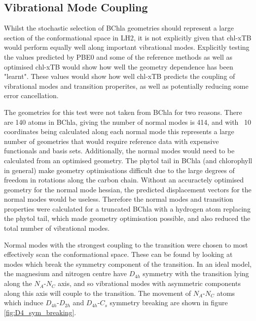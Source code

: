 \subsection{Vibrational Mode Coupling}
\label{subsec:pot_energy_surfaces}

Whilst the stochastic selection of BChla geometries should represent a large section 
of the conformational space in LH2, it is not explicitly given that chl-xTB would
perform equally well along important vibrational modes. Explicitly testing the
values predicted by PBE0 and some of the reference methods as well as optimised
chl-xTB would show how well the geometry dependence has been "learnt". These values
would show how well chl-xTB predicts the coupling of vibrational modes and transition 
properites, as well as potentially reducing some error cancellation.

The geometries for this test were not taken from BChla for two reasons. There are
140 atoms in BChla, giving the number of normal modes is 414, and with ~10 coordinates
being calculated along each normal mode this represents a large number of geometries
that would require reference data with expensive functionals and basis sets. Additionally,
the normal modes would need to be calculated from an optimised geometry. The phytol
tail in BChla (and chlorophyll in general) make geometry optimisations difficult
due to the large degrees of freedom in rotations along the carbon chain. Without
an accuractely optimised geometry for the normal mode hessian, the predicted displacement
vectors for the normal modes would be useless. Therefore the normal modes and transition 
properties were calculated for a truncated BChla with a hydrogen atom replacing 
the phytol tail, which made geometry optimisation possible, and also reduced the
total number of vibrational modes.

Normal modes with the strongest coupling to the \Qy transition were chosen to most
effectively scan the conformational space. These can be found by looking at modes
which break the symmetry component of the \Qy transition. In an ideal model, the 
magnesium and nitrogen centre have $D_{4h}$ symmetry with the \Qy transition lying 
along the $N_A$-$N_C$ axis, and so vibrational modes with asymmetric components 
along this axis will couple to the transition. The movement of $N_A$-$N_C$ atoms 
which induce $D_{4h}$-$D_{2h}$ and $D_{4h}$-$C_{s}$ symmetry breaking are shown
in figure \ref{fig:D4_sym_breaking}.

